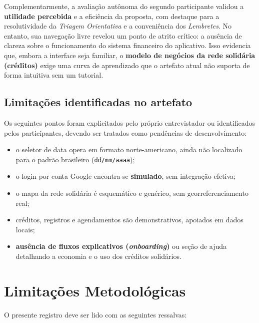 \documentclass[12pt,a4paper]{article}
\begin{document}
Complementarmente, a avaliação autônoma do segundo participante validou a \textbf{utilidade percebida} e a eficiência da proposta, com destaque para a resolutividade da \textit{Triagem Orientativa} e a conveniência dos \textit{Lembretes}. No entanto, sua navegação livre revelou um ponto de atrito crítico: a ausência de clareza sobre o funcionamento do sistema financeiro do aplicativo. Isso evidencia que, embora a interface seja familiar, o \textbf{modelo de negócios da rede solidária (créditos)} exige uma curva de aprendizado que o artefato atual não suporta de forma intuitiva sem um tutorial.

\subsection{Limitações identificadas no artefato}

Os seguintes pontos foram explicitados pelo próprio entrevistador ou identificados pelos participantes, devendo ser tratados como pendências de desenvolvimento:

\begin{itemize}[leftmargin=*]
  \item o seletor de data opera em formato norte-americano, ainda não localizado para o padrão brasileiro (\texttt{dd/mm/aaaa});
  \item o login por conta Google encontra-se \textbf{simulado}, sem integração efetiva;
  \item o mapa da rede solidária é esquemático e genérico, sem georreferenciamento real;
  \item créditos, registros e agendamentos são demonstrativos, apoiados em dados locais;
  \item \textbf{ausência de fluxos explicativos (\textit{onboarding})} ou seção de ajuda detalhando a economia e o uso dos créditos solidários.
\end{itemize}

\section{Limitações Metodológicas}

O presente registro deve ser lido com as seguintes ressalvas:
\end{document}
